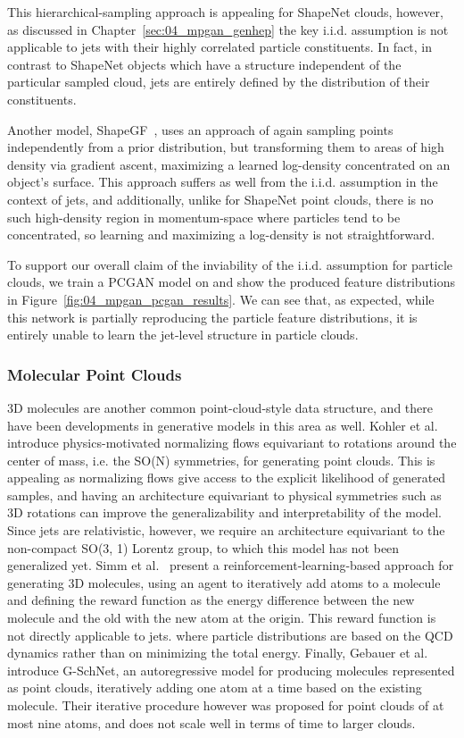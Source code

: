 This hierarchical-sampling approach is appealing for ShapeNet clouds, however, as discussed in Chapter~\ref{sec:04_mpgan_genhep} the key i.i.d. assumption is not applicable to jets with their highly correlated particle constituents.
In fact, in contrast to ShapeNet objects which have a structure independent of the particular sampled cloud, jets are entirely defined by the distribution of their constituents.

Another model, ShapeGF~\cite{ShapeGF}, uses an approach of again sampling points independently from a prior distribution, but transforming them to areas of high density via gradient ascent, maximizing a learned log-density concentrated on an object's surface.
This approach suffers as well from the i.i.d. assumption in the context of jets, and additionally, unlike for ShapeNet point clouds, there is no such high-density region in momentum-space where particles tend to be concentrated, so learning and maximizing a log-density is not straightforward.

To support our overall claim of the inviability of the i.i.d. assumption for particle clouds, we train a PCGAN model on \jetnet and show the produced feature distributions in Figure~\ref{fig:04_mpgan_pcgan_results}.
We can see that, as expected, while this network is partially reproducing the particle feature distributions, it is entirely unable to learn the jet-level structure in particle clouds.

\subsubsection{Molecular Point Clouds}

3D molecules are another common point-cloud-style data structure, and there have been developments in generative models in this area as well.
Kohler et al.~\cite{kohler20} introduce physics-motivated normalizing flows equivariant to rotations around the center of mass, i.e. the SO(N) symmetries, for generating point clouds.
This is appealing as normalizing flows give access to the explicit likelihood of generated samples, and having an architecture equivariant to physical symmetries such as 3D rotations can improve the generalizability and interpretability of the model.
Since jets are relativistic, however, we require an architecture equivariant to the non-compact SO(3, 1) Lorentz group, to which this model has not been generalized yet.
Simm et al.~\cite{simm21} present a reinforcement-learning-based approach for generating 3D molecules, using an agent to iteratively add atoms to a molecule and defining the reward function as the energy difference between the new molecule and the old with the new atom at the origin.
This reward function is not directly applicable to jets. where particle distributions are based on the QCD dynamics rather than on minimizing the total energy.
Finally, Gebauer et al.~\cite{gschnet} introduce G-SchNet, an autoregressive model for producing molecules represented as point clouds, iteratively adding one atom at a time based on the existing molecule.
Their iterative procedure however was proposed for point clouds of at most nine atoms, and does not scale well in terms of time to larger clouds.

